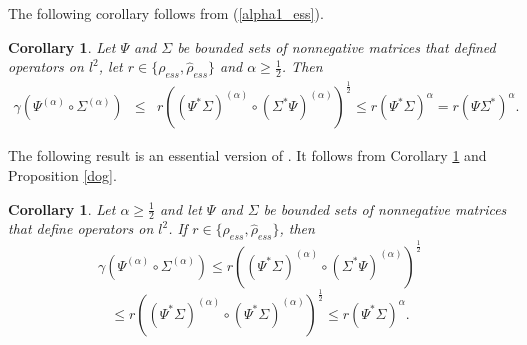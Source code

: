 \documentclass[12pt, reqno]{amsart}
\newtheorem{corollary}[theorem]{Corollary}
\theoremstyle{definition}
\theoremstyle{remark}
\numberwithin{equation}{section}
\newcommand{\be}{\begin{equation}}
\newcommand{\ee}{\end{equation}}
\begin{document}
The following corollary follows from (\ref{alpha1_ess}).
\begin{corollary} Let $\Psi$ and $\Sigma$ be bounded sets of nonnegative matrices that defined  operators on $l^2$, let  $r \in\{\rho _{ess},\hat{\rho} _{ess}\}$ and $\alpha \ge \frac{1}{2}$. Then
\begin{eqnarray}
\nonumber
\gamma (\Psi ^{(\alpha)} \circ  \Sigma^{(\alpha)} ) &\le& r  \left ( (\Psi^* \Sigma) ^{(\alpha)}\circ (\Sigma ^* \Psi)^{(\alpha)}\right)^{\frac{1}{2}}\le r (\Psi^* \Sigma )^{\alpha} =
r  \left (\Psi \Sigma ^* \right)^{\alpha}  . %
\end{eqnarray}
\label{dobra_ess10}
\end{corollary}
The following result is an essential version of \cite[Corollary 3.17]{B23+}. It follows from Corollary \ref{dobra_ess10} and Proposition \ref{dog}.
\begin{corollary}
Let $\alpha\ge\frac{1}{2}$ and let $\Psi$ and $\Sigma$ be bounded sets of nonnegative matrices that define operators on $l^2$. If $r\in\{\rho_{ess}, \hat{\rho}_{ess}\}$, then
$$\gamma(\Psi^{(\alpha)}\circ\Sigma^{(\alpha)})\le r((\Psi^*\Sigma)^{(\alpha)}\circ(\Sigma^*\Psi)^{(\alpha)})^{\frac{1}{2}}$$
\be
\nonumber
\le r((\Psi^*\Sigma)^{(\alpha)}\circ(\Psi^*\Sigma)^{(\alpha)})^{\frac{1}{2}}\le r(\Psi^*\Sigma)^{\alpha}.
\label{matrix}
\ee
\end{corollary}
\medskip
\end{document}
